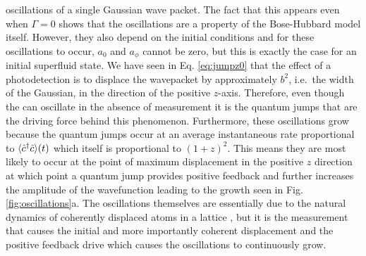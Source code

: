 oscillations of a single Gaussian wave packet. The fact that this
appears even when $\Gamma = 0$ shows that the oscillations are a
property of the Bose-Hubbard model itself. However, they also depend
on the initial conditions and for these oscillations to occur, $a_0$
and $a_\phi$ cannot be zero, but this is exactly the case for an
initial superfluid state. We have seen in Eq. \eqref{eq:jumpz0} that
the effect of a photodetection is to displace the wavepacket by
approximately $b^2$, i.e.~the width of the Gaussian, in the direction
of the positive $z$-axis. Therefore, even though the can oscillate in
the absence of measurement it is the quantum jumps that are the
driving force behind this phenomenon. Furthermore, these oscillations
grow because the quantum jumps occur at an average instantaneous rate
proportional to $\langle \hat{c}^\dagger \hat{c} \rangle (t)$ which itself is
proportional to $(1+z)^2$. This means they are most likely to occur at
the point of maximum displacement in the positive $z$ direction at
which point a quantum jump provides positive feedback and further
increases the amplitude of the wavefunction leading to the growth seen
in Fig. \ref{fig:oscillations}a. The oscillations themselves are
essentially due to the natural dynamics of coherently displaced atoms
in a lattice , but it is the measurement that causes the initial and
more importantly coherent displacement and the positive feedback drive
which causes the oscillations to continuously grow.

